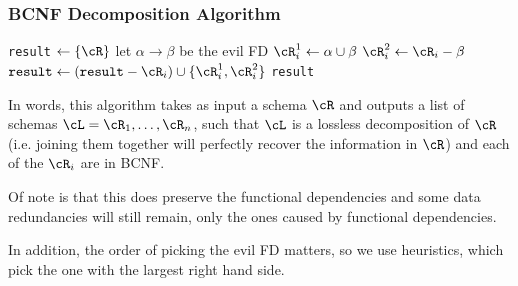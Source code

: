 \newpage
\subsubsection{BCNF Decomposition Algorithm}
\begin{algorithm}
    \caption{Decomposition algorithm}
    \begin{algorithmic}[1]
            \State \texttt{result} $\gets \{ \cR \}$
                \State let $\alpha \rightarrow \beta$ be the evil FD
                \State $\cR_i^1 \gets \alpha \cup \beta$
                \State $\cR_i^2 \gets \cR_i - \beta$
                \State $\texttt{result} \gets (\texttt{result} - \cR_i) \cup \{ \cR_i^1, \cR_i^2 \}$
            \EndWhile
            \State \Return \texttt{result}
        \EndProcedure
    \end{algorithmic}
\end{algorithm}
In words, this algorithm takes as input a schema $\cR$ and outputs a list of schemas $\cL = \cR_1, \ldots, \cR_n$,
such that $\cL$ is a lossless decomposition of $\cR$ (i.e. joining them together will perfectly recover the information in $\cR$)
and each of the $\cR_i$ are in BCNF.

Of note is that this does  preserve the functional dependencies and some data redundancies will still remain,
only the ones caused by functional dependencies.

In addition, the order of picking the evil FD matters, so we use heuristics, which pick the one with the largest right hand side.

